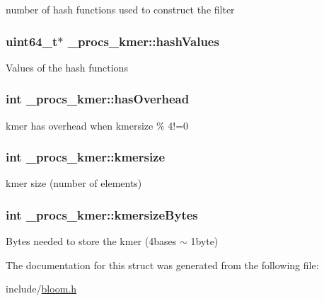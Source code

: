number of hash functions used to construct the filter \hypertarget{struct__procs__kmer_ac47c2d17d8a2559b22593e1beb7bb48a}{
\subsubsection[{hash\+Values}]{\setlength{\rightskip}{0pt plus 5cm}uint64\+\_\+t$\ast$ \+\_\+procs\+\_\+kmer\+::hash\+Values}}\label{struct__procs__kmer_ac47c2d17d8a2559b22593e1beb7bb48a}
Values of the hash functions \hypertarget{struct__procs__kmer_a13ad18789320173c1a2ea9c514571cb7}{
\subsubsection[{has\+Overhead}]{\setlength{\rightskip}{0pt plus 5cm}int \+\_\+procs\+\_\+kmer\+::has\+Overhead}}\label{struct__procs__kmer_a13ad18789320173c1a2ea9c514571cb7}
kmer has overhead when kmersize \% 4!=0 \hypertarget{struct__procs__kmer_acd250ab75fc47fde7d3e9ff1b2977f14}{
\subsubsection[{kmersize}]{\setlength{\rightskip}{0pt plus 5cm}int \+\_\+procs\+\_\+kmer\+::kmersize}}\label{struct__procs__kmer_acd250ab75fc47fde7d3e9ff1b2977f14}
kmer size (number of elements) \hypertarget{struct__procs__kmer_a0e08c6a8147fb51c5c891e957d5c7c93}{
\subsubsection[{kmersize\+Bytes}]{\setlength{\rightskip}{0pt plus 5cm}int \+\_\+procs\+\_\+kmer\+::kmersize\+Bytes}}\label{struct__procs__kmer_a0e08c6a8147fb51c5c891e957d5c7c93}
Bytes needed to store the kmer (4bases $\sim$ 1byte) 

The documentation for this struct was generated from the following file\+:\begin{DoxyCompactItemize}
\item 
include/\hyperlink{bloom_8h}{bloom.\+h}\end{DoxyCompactItemize}
